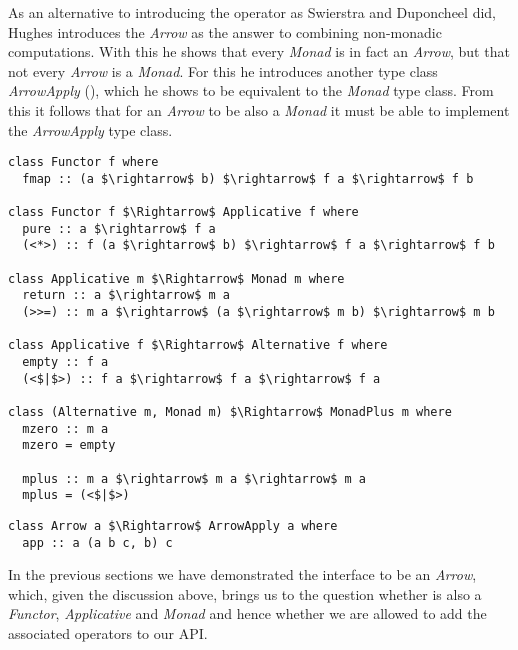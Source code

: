 As an alternative to introducing the \code{(<*>)} operator as Swierstra and Duponcheel did, Hughes introduces the \textit{Arrow} as the answer to combining non-monadic computations. With this he shows that every \textit{Monad} is in fact an \textit{Arrow}, but that not every \textit{Arrow} is a \textit{Monad}. For this he introduces another type class \textit{ArrowApply} (), which he shows to be equivalent to the \textit{Monad} type class. From this it follows that for an \textit{Arrow} to be also a \textit{Monad} it must be able to implement the \textit{ArrowApply} type class.

\begin{minipage}{0.6\linewidth}
\begin{lstlisting}[style=HaskellStyle, caption={Type classes for monads}, label={lst:type-classes-for-monads}, captionpos=b, numbers=none]
class Functor f where
  fmap :: (a $\rightarrow$ b) $\rightarrow$ f a $\rightarrow$ f b

class Functor f $\Rightarrow$ Applicative f where
  pure :: a $\rightarrow$ f a
  (<*>) :: f (a $\rightarrow$ b) $\rightarrow$ f a $\rightarrow$ f b

class Applicative m $\Rightarrow$ Monad m where
  return :: a $\rightarrow$ m a
  (>>=) :: m a $\rightarrow$ (a $\rightarrow$ m b) $\rightarrow$ m b

class Applicative f $\Rightarrow$ Alternative f where
  empty :: f a
  (<$|$>) :: f a $\rightarrow$ f a $\rightarrow$ f a

class (Alternative m, Monad m) $\Rightarrow$ MonadPlus m where
  mzero :: m a
  mzero = empty
  
  mplus :: m a $\rightarrow$ m a $\rightarrow$ m a
  mplus = (<$|$>)
\end{lstlisting}
\end{minipage}
\begin{minipage}{0.4\linewidth}
\end{minipage}

\begin{lstlisting}[style=HaskellStyle, caption={ArrowApply}, label={lst:arrow-apply}, captionpos=b, numbers=none]
class Arrow a $\Rightarrow$ ArrowApply a where
  app :: a (a b c, b) c
\end{lstlisting}

In the previous sections we have demonstrated the \comp interface to be an \textit{Arrow}, which, given the discussion above, brings us to the question whether \comp is also a \textit{Functor}, \textit{Applicative} and \textit{Monad} and hence whether we are allowed to add the associated operators to our API.

